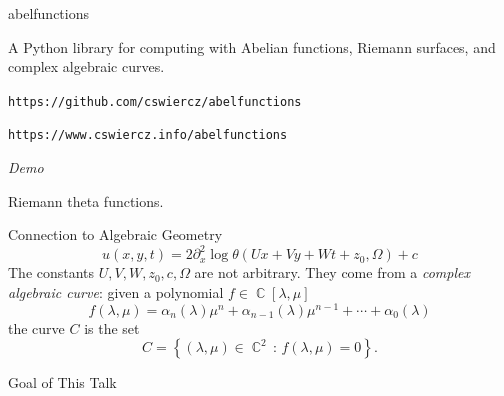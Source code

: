 \documentclass{beamer}
\DeclareMathOperator{\CC}{\mathbb{C}}
\begin{document}
\begin{frame}{abelfunctions}{}
  \begin{block}{}
  \begin{figure}[t]
    \centering
  \end{figure}
  \end{block}

  \vspace{16pt}

  A Python library for computing with Abelian functions, Riemann
  surfaces, and complex algebraic curves.
  \begin{center}
    {\tt https://github.com/cswiercz/abelfunctions}

    {\tt https://www.cswiercz.info/abelfunctions}
  \end{center}
\end{frame}



\begin{frame}{\phantom{Demo}}{}
  \begin{center}
    {\huge \it Demo}

    \vspace{1cm}

    Riemann theta functions.
  \end{center}
\end{frame}



\begin{frame}{Connection to Algebraic Geometry}{}
  \[
    u(x,y,t) = 2 \partial_x^2 \log
    \theta(Ux + Vy + Wt + z_0, \Omega) + c
  \]
  The constants $U,V,W,z_0,c,\Omega$ are not arbitrary. They come from a
  {\it complex algebraic curve}: given a polynomial $f \in
  \CC[\lambda,\mu]$
  \[
      f(\lambda,\mu) =
      \alpha_n(\lambda)\mu^n +
      \alpha_{n-1}(\lambda)\mu^{n-1} +
      \cdots +
      \alpha_0(\lambda)
  \]
  the curve $C$ is the set
  \[
  C = \left\{ (\lambda,\mu) \in \CC^2 \, : \, f(\lambda,\mu) = 0 \right\}.
  \]
\end{frame}



\begin{frame}{Goal of This Talk}{}
  \tableofcontents
\end{frame}



\end{document}
